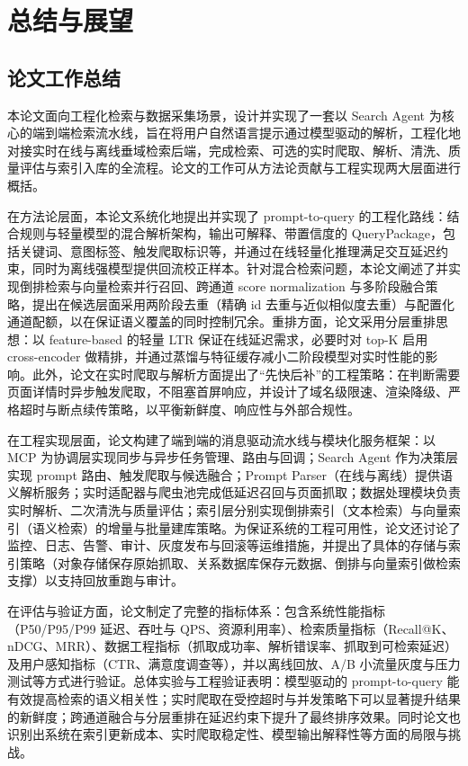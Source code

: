 \chapter{总结与展望}
\section{论文工作总结}
本论文面向工程化检索与数据采集场景，设计并实现了一套以 Search Agent 为核心的端到端检索流水线，旨在将用户自然语言提示通过模型驱动的解析，工程化地对接实时在线与离线垂域检索后端，完成检索、可选的实时爬取、解析、清洗、质量评估与索引入库的全流程。论文的工作可从方法论贡献与工程实现两大层面进行概括。

在方法论层面，本论文系统化地提出并实现了 prompt-to-query 的工程化路线：结合规则与轻量模型的混合解析架构，输出可解释、带置信度的 QueryPackage，包括关键词、意图标签、触发爬取标识等，并通过在线轻量化推理满足交互延迟约束，同时为离线强模型提供回流校正样本。针对混合检索问题，本论文阐述了并实现倒排检索与向量检索并行召回、跨通道 score normalization 与多阶段融合策略，提出在候选层面采用两阶段去重（精确 id 去重与近似相似度去重）与配置化通道配额，以在保证语义覆盖的同时控制冗余。重排方面，论文采用分层重排思想：以 feature-based 的轻量 LTR 保证在线延迟需求，必要时对 top-K 启用 cross-encoder 做精排，并通过蒸馏与特征缓存减小二阶段模型对实时性能的影响。此外，论文在实时爬取与解析方面提出了“先快后补”的工程策略：在判断需要页面详情时异步触发爬取，不阻塞首屏响应，并设计了域名级限速、渲染降级、严格超时与断点续传策略，以平衡新鲜度、响应性与外部合规性。

在工程实现层面，论文构建了端到端的消息驱动流水线与模块化服务框架：以 MCP 为协调层实现同步与异步任务管理、路由与回调；Search Agent 作为决策层实现 prompt 路由、触发爬取与候选融合；Prompt Parser（在线与离线）提供语义解析服务；实时适配器与爬虫池完成低延迟召回与页面抓取；数据处理模块负责实时解析、二次清洗与质量评估；索引层分别实现倒排索引（文本检索）与向量索引（语义检索）的增量与批量建库策略。为保证系统的工程可用性，论文还讨论了监控、日志、告警、审计、灰度发布与回滚等运维措施，并提出了具体的存储与索引策略（对象存储保存原始抓取、关系数据库保存元数据、倒排与向量索引做检索支撑）以支持回放重跑与审计。

在评估与验证方面，论文制定了完整的指标体系：包含系统性能指标（P50/P95/P99 延迟、吞吐与 QPS、资源利用率）、检索质量指标（Recall@K、nDCG、MRR）、数据工程指标（抓取成功率、解析错误率、抓取到可检索延迟）及用户感知指标（CTR、满意度调查等），并以离线回放、A/B 小流量灰度与压力测试等方式进行验证。总体实验与工程验证表明：模型驱动的 prompt-to-query 能有效提高检索的语义相关性；实时爬取在受控超时与并发策略下可以显著提升结果的新鲜度；跨通道融合与分层重排在延迟约束下提升了最终排序效果。同时论文也识别出系统在索引更新成本、实时爬取稳定性、模型输出解释性等方面的局限与挑战。

